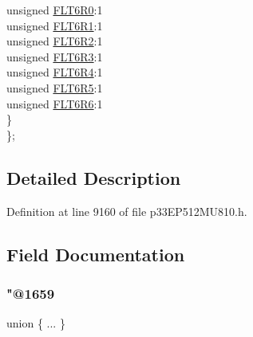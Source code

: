 \begin{DoxyCompactItemize}
\begin{tabbing}
\>\>unsigned \hyperlink{structtag_r_p_i_n_r42_b_i_t_s_a4b7a0157b950287a7687971af91b0751}{FLT6R0}:1\\
\>\>unsigned \hyperlink{structtag_r_p_i_n_r42_b_i_t_s_a86a41b09ed2a4d8118a5645ec702f529}{FLT6R1}:1\\
\>\>unsigned \hyperlink{structtag_r_p_i_n_r42_b_i_t_s_a068f330d0e56141c511c0320a4a0e6b8}{FLT6R2}:1\\
\>\>unsigned \hyperlink{structtag_r_p_i_n_r42_b_i_t_s_a4fa6119389131c8f24e0146e0e5427c3}{FLT6R3}:1\\
\>\>unsigned \hyperlink{structtag_r_p_i_n_r42_b_i_t_s_aa3ecf013f437f827834ed42cc0234d3c}{FLT6R4}:1\\
\>\>unsigned \hyperlink{structtag_r_p_i_n_r42_b_i_t_s_a0e4d9f63b476c7b982f3971b6e21b6f9}{FLT6R5}:1\\
\>\>unsigned \hyperlink{structtag_r_p_i_n_r42_b_i_t_s_aae8e6609d5c855261ccb8e6232d12195}{FLT6R6}:1\\
\>\} \\
\}; \\

\end{tabbing}\end{DoxyCompactItemize}


\subsection{Detailed Description}


Definition at line 9160 of file p33\+E\+P512\+M\+U810.\+h.



\subsection{Field Documentation}
\mbox{\label{structtag_r_p_i_n_r42_b_i_t_s_af66de72ecedde20029e2b63a33de4d7c}} 
\subsubsection{\texorpdfstring{"@1659}{@1659}}
{\footnotesize\ttfamily union \{ ... \} }

\mbox{\label{structtag_r_p_i_n_r42_b_i_t_s_adf71f3d8410c1f1dbbc96680a92c49af}} 
